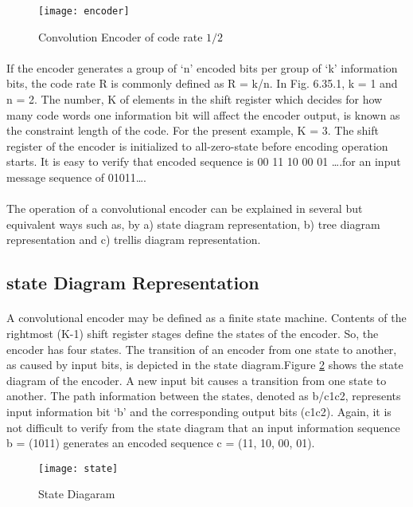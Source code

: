 \documentclass[14pt]{report}
\begin{document}
{\begin{figure}[ht]
\centering
\texttt{[image: encoder]}
\label{fig:convenc}
\caption{Convolution Encoder of code rate $1/2$}
\end{figure}
\paragraph{} If the encoder generates a group of ‘n’ encoded bits per group of ‘k’ information bits, the code rate R is commonly defined as R = k/n. In Fig. 6.35.1, k = 1 and n = 2. The number, K of elements in the shift register which decides for how many code words one information bit will affect the encoder output, is known as the constraint length of the code. For the present example, K = 3. The shift register of the encoder is initialized to all-zero-state before encoding operation starts. It is easy to verify that encoded sequence is 00 11 10 00 01 ….for an input message sequence of 01011….
\paragraph{} The operation of a convolutional encoder can be explained in several but equivalent ways such as, by a) state diagram representation, b) tree diagram representation and c) trellis diagram representation.
\subsection{state Diagram Representation}
\paragraph{} A convolutional encoder may be defined as a finite state machine. Contents of the rightmost (K-1) shift register stages define the states of the encoder. So, the encoder has four states. The transition of an encoder from one state to another, as caused by input bits, is depicted in the state diagram.Figure \ref{fig:st} shows the state diagram of the encoder. A new input bit causes a transition from one state to another. The path information between the states, denoted as b/c1c2, represents input information bit ‘b’ and the corresponding output bits (c1c2). Again, it is not difficult to verify from the state diagram that an input information sequence b = (1011) generates an encoded sequence c = (11, 10, 00, 01).
\begin{figure}[ht]
\centering
\texttt{[image: state]}
\label{fig:st}
\caption{State Diagaram}
\end{figure}\\
}
\end{document}
